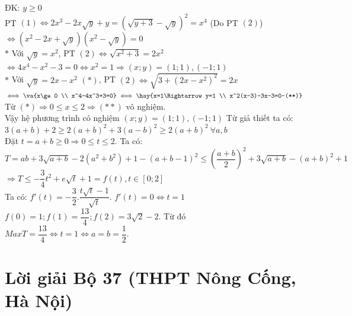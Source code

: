 \lgi 
ĐK: $y\ge 0$\\
PT $(1)\iff 2x^3-2x\sqrt{y}+y=\left(\sqrt{y+3}-\sqrt{y}\right)^2=x^4$ (Do PT $(2)$)\\
$\iff \left(x^2-2x+\sqrt{y}\right)\left(x^2-\sqrt{y}\right)=0$\\
$*$ Với $\sqrt{y}=x^2$, PT $(2)\iff \sqrt{x^2+3}=2x^2$\\
$\iff 4x^4-x^2-3=0\iff x^2=1\Rightarrow (x;y)=(1;1),(-1;1)$\\
$*$ Với $\sqrt{y}=2x-x^2$ $(*)$, PT $(2)\iff \sqrt{3+(2x-x^2)^2}=2x$\\
$\iff \va{x\ge 0 \\ x^4-4x^3+3=0}\iff \hay{x=1\Rightarrow y=1 \\ x^2(x-3)-3x-3=0~(**)}$\\
Từ $(*)\Rightarrow 0\le x\le 2\Rightarrow (**)$ vô nghiệm.\\
Vậy hệ phương trình có nghiệm $(x;y)=(1;1),(-1;1)$
\hda 
Từ giả thiết ta có: $3(a+b)+2\ge 2(a+b)^2+3(a-b)^2\ge 2(a+b)^2~\forall a,b$\\
Đặt $t=a+b\ge 0\Rightarrow 0\le t\le 2$.
Ta có:\\
$T=ab+3\sqrt{a+b}-2(a^2+b^2)+1-(a+b-1)^2\le \left(\dfrac{a+b}{2}\right)^2+3\sqrt{a+b}-(a+b)^2+1$\\
$\Rightarrow T\le -\dfrac{3}{4}t^2+e\sqrt{t}+1=f(t), t\in [0;2]$\\
Ta có: $f'(t)=-\dfrac{3}{2}.\dfrac{t\sqrt{t}-1}{\sqrt{t}}$.
$f'(t)=0\iff t=1$\\
$f(0)=1;f(1)=\dfrac{13}{4};f(2)=3\sqrt{2}-2$.
Từ đó $Max T=\dfrac{13}{4}\iff t=1\iff a=b=\dfrac{1}{2}$.

\section{Lời giải Bộ 37 (THPT Nông Cống, Hà Nội) }

\lgi 
\vspace{5cm}

